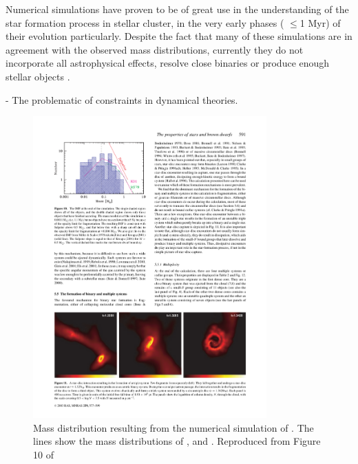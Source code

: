 
Numerical simulations have proven to be of great use in the understanding of the star formation process in stellar cluster, in the very early phases ( $\leq$1 Myr) of their evolution particularly.  Despite the fact that many of these simulations are in agreement with the observed mass distributions, currently they do not incorporate all astrophysical effects, resolve close binaries or produce enough stellar objects \citep{Offner2014}. 

- The problematic of constraints in dynamical theories.

\begin{figure}[htbp]
\begin{center}
\includegraphics[width=0.8\textwidth]{background/Figures/F10_Bate2003.pdf}
\caption{Mass distribution resulting from the numerical simulation of \citet{2003MNRAS.339..577B}. The lines show the mass distributions of \citet{Salpeter1955}, \citet{1979ApJS...41..513M} and \citet{2001MNRAS.322..231K}. Reproduced from Figure 10 of \citet{2003MNRAS.339..577B}}
\label{fig:IMFBate2003}
\end{center}
\end{figure}

